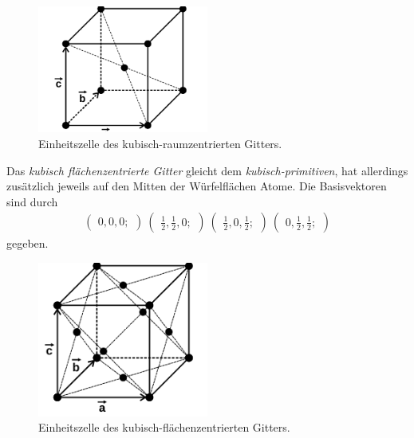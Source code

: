 \begin{figure}[hhh]
  \centering
  \includegraphics[width=0.5\textwidth]{abbildungen/bcc.png}
  \caption{Einheitszelle des kubisch-raumzentrierten Gitters.\cite{sample}}
  \label{fig:bcc}
\end{figure}

Das \textit{kubisch flächenzentrierte Gitter} gleicht dem
\textit{kubisch-primitiven}, hat
allerdings zusätzlich jeweils auf den Mitten der Würfelflächen Atome.
Die Basisvektoren sind durch
\begin{align}
   \label{eqn:3*}
   \begin{pmatrix}
     0, 0, 0;
   \end{pmatrix}\
   \begin{pmatrix}
     \frac{1}{2}, \frac{1}{2}, 0;
   \end{pmatrix}\
   \begin{pmatrix}
     \frac{1}{2}, 0, \frac{1}{2};
     \end{pmatrix}\
     \begin{pmatrix}
       0, \frac{1}{2}, \frac{1}{2};
     \end{pmatrix}
\end{align}
gegeben.

\begin{figure}[hhh]
  \centering
  \includegraphics[width=0.5\textwidth]{abbildungen/fcc.png}
  \caption{Einheitszelle des kubisch-flächenzentrierten Gitters.\cite{sample}}
  \label{fig:fcc}
\end{figure}

